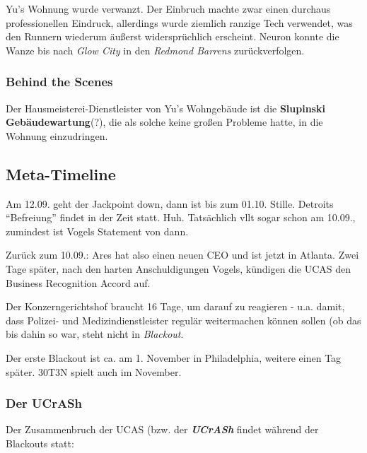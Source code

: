 Yu's Wohnung wurde verwanzt. Der Einbruch machte zwar einen durchaus professionellen Eindruck, allerdings wurde ziemlich ranzige Tech verwendet, was den Runnern wiederum äußerst widersprüchlich erscheint. Neuron konnte die Wanze bis nach \textit{Glow City} in den \textit{Redmond Barrens} zurückverfolgen.

\subsubsection{Behind the Scenes}

Der Hausmeisterei-Dienstleister von Yu's Wohngebäude ist die \textbf{Slupinski Gebäudewartung}(?), die als solche keine großen Probleme hatte, in die Wohnung einzudringen.




\subsection{Meta-Timeline}

Am 12.09. geht der Jackpoint down, dann ist bis zum 01.10. Stille. Detroits ``Befreiung'' findet in der Zeit statt. Huh. Tatsächlich vllt sogar schon am 10.09., zumindest ist Vogels Statement von dann.

Zurück zum 10.09.: Ares hat also einen neuen CEO und ist jetzt in Atlanta. Zwei Tage später, nach den harten Anschuldigungen Vogels, kündigen die UCAS den Business Recognition Accord auf.

Der Konzerngerichtshof braucht 16 Tage, um darauf zu reagieren - u.a. damit, dass Polizei- und Medizindienstleister regulär weitermachen können sollen (ob das bis dahin so war, steht nicht in \textit{Blackout}.

Der erste Blackout ist ca. am 1. November in Philadelphia, weitere einen Tag später. 30T3N spielt auch im November. 


\subsubsection{Der UCrASh}

Der Zusammenbruch der UCAS (bzw. der \textit{\textbf{UCrASh}} findet während der Blackouts statt:

